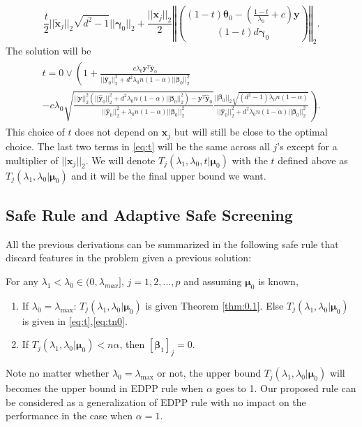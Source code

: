 \begin{equation}
    \frac{t}{2}||\tilde{\boldsymbol x}_j||_2\sqrt{d^2-1}||\boldsymbol\gamma_{0}||_2+\frac{||\boldsymbol x_j||_2}{2}\left\Vert\binom{(1-t)\boldsymbol\theta_{0}-\left(\frac{1-t}{\lambda_0}+c\right)\boldsymbol y}{(1-t)d\boldsymbol\gamma_{0}}\right\Vert_2.
\end{equation}
The solution will be
\begin{align}
    \label{eq:tn0}
    \begin{gathered}
        t=0\vee\left(1+\frac{c\lambda_0\boldsymbol y^T\hat{\boldsymbol y}_{0}}{||\hat{\boldsymbol y}_{0}||_2^2+d^2\lambda_0n(1-\alpha)||\boldsymbol\beta_{0}||_2^2}\right.\\
        \left.-c\lambda_0\sqrt{\frac{||\boldsymbol y||_2^2\left(||\hat{\boldsymbol y}_{0}||_2^2+d^2\lambda_0n(1-\alpha)||\boldsymbol\beta_{0}||_2^2\right)-\boldsymbol y^T\hat{\boldsymbol y}_{0}}{||\hat{\boldsymbol y}_{0}||_2^2+\lambda_0n(1-\alpha)||\boldsymbol\beta_{0}||_2^2}}
        \frac{||\boldsymbol\beta_{0}||_2\sqrt{(d^2-1)\lambda_0n(1-\alpha)}}{||\hat{\boldsymbol y}_{0}||_2^2+d^2\lambda_0n(1-\alpha)||\boldsymbol\beta_{0}||_2^2}\right).
    \end{gathered}
\end{align}
This choice of $t$ does not depend on $\boldsymbol x_j$ but will still be close to the optimal choice. The last two terms in \eqref{eq:t} will be the same across all $j$'s except for a multiplier of $||\boldsymbol x_j||_2$. We will denote $T_j(\lambda_1,\lambda_0,t|\boldsymbol\mu_0)$ with the $t$ defined above as $T_j(\lambda_1,\lambda_0|\boldsymbol\mu_0)$ and it will be the final upper bound we want.

\subsection{Safe Rule and Adaptive Safe Screening}

All the previous derivations can be summarized in the following safe rule that discard features in the problem given a previous solution:

\begin{theorem}
    \label{thm:rule}
    For any $\lambda_1<\lambda_{0}\in (0,\lambda_{max}]$, $j=1,2,...,p$ and assuming $\boldsymbol\mu_0$ is known,
    \begin{enumerate}
        \item If $\lambda_0=\lambda_{\max}$: $T_j(\lambda_1,\lambda_0|\boldsymbol\mu_0)$ is given Theorem \ref{thm:0.1}. Else $T_j(\lambda_1,\lambda_0|\boldsymbol\mu_0)$ is given in \eqref{eq:t},\eqref{eq:tn0}.
        \item If $T_j(\lambda_1,\lambda_0|\boldsymbol\mu_0)<n\alpha$, then $[\boldsymbol\beta_{1}]_j=0$.
    \end{enumerate}
\end{theorem}
Note no matter whether $\lambda_0=\lambda_{\max}$ or not, the upper bound $T_j(\lambda_1,\lambda_0|\boldsymbol\mu_0)$ will becomes the upper bound in EDPP rule when $\alpha$ goes to 1. Our proposed rule can be considered as a generalization of EDPP rule with no impact on the performance in the case when $\alpha=1$.

